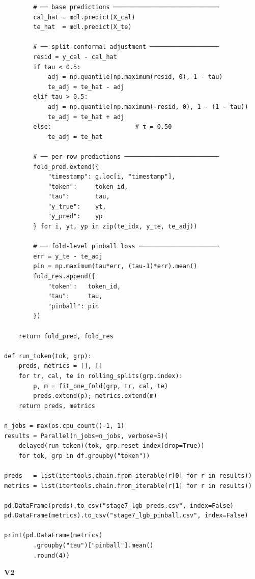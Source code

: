 \documentclass[
  a4paper,
  DIV=11,
  numbers=noendperiod]{scrreprt}
\begin{document}
\begin{verbatim}
        # ── base predictions ─────────────────────────────
        cal_hat = mdl.predict(X_cal)
        te_hat  = mdl.predict(X_te)

        # ── split-conformal adjustment ───────────────────
        resid = y_cal - cal_hat
        if tau < 0.5:
            adj = np.quantile(np.maximum(resid, 0), 1 - tau)
            te_adj = te_hat - adj
        elif tau > 0.5:
            adj = np.quantile(np.maximum(-resid, 0), 1 - (1 - tau))
            te_adj = te_hat + adj
        else:                       # τ = 0.50
            te_adj = te_hat

        # ── per-row predictions ──────────────────────────
        fold_pred.extend({
            "timestamp": g.loc[i, "timestamp"],
            "token":     token_id,
            "tau":       tau,
            "y_true":    yt,
            "y_pred":    yp
        } for i, yt, yp in zip(te_idx, y_te, te_adj))

        # ── fold-level pinball loss ──────────────────────
        err = y_te - te_adj
        pin = np.maximum(tau*err, (tau-1)*err).mean()
        fold_res.append({
            "token":   token_id,
            "tau":     tau,
            "pinball": pin
        })

    return fold_pred, fold_res

def run_token(tok, grp):
    preds, metrics = [], []
    for tr, cal, te in rolling_splits(grp.index):
        p, m = fit_one_fold(grp, tr, cal, te)
        preds.extend(p); metrics.extend(m)
    return preds, metrics

n_jobs = max(os.cpu_count()-1, 1)
results = Parallel(n_jobs=n_jobs, verbose=5)(
    delayed(run_token)(tok, grp.reset_index(drop=True))
    for tok, grp in df.groupby("token"))

preds   = list(itertools.chain.from_iterable(r[0] for r in results))
metrics = list(itertools.chain.from_iterable(r[1] for r in results))

pd.DataFrame(preds).to_csv("stage7_lgb_preds.csv", index=False)
pd.DataFrame(metrics).to_csv("stage7_lgb_pinball.csv", index=False)

print(pd.DataFrame(metrics)
        .groupby("tau")["pinball"].mean()
        .round(4))
\end{verbatim}

\textbf{V2}
\end{document}
